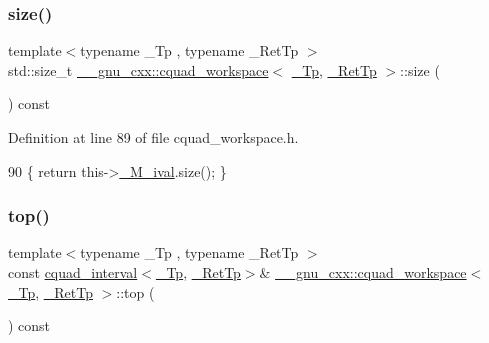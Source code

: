\subsubsection{\texorpdfstring{size()}{size()}}
{\footnotesize\ttfamily template$<$typename \+\_\+\+Tp , typename \+\_\+\+Ret\+Tp $>$ \\
std\+::size\+\_\+t \hyperlink{struct____gnu__cxx_1_1cquad__workspace}{\+\_\+\+\_\+gnu\+\_\+cxx\+::cquad\+\_\+workspace}$<$ \hyperlink{namespace____gnu__cxx_a3b19a9c800ca194374ef9172290f7d79}{\+\_\+\+Tp}, \hyperlink{namespace____gnu__cxx_a886e03ece3d53ff7fa6c098a40f93fa5}{\+\_\+\+Ret\+Tp} $>$\+::size (\begin{DoxyParamCaption}{ }\end{DoxyParamCaption}) const\hspace{0.3cm}{\ttfamily [inline]}}



Definition at line 89 of file cquad\+\_\+workspace.\+h.


\begin{DoxyCode}
90       \{ \textcolor{keywordflow}{return} this->\hyperlink{struct____gnu__cxx_1_1cquad__workspace_a46edeb05c52f2a406dc582b404fe83e6}{\_M\_ival}.size(); \}
\end{DoxyCode}
\mbox{\label{struct____gnu__cxx_1_1cquad__workspace_a6da1e7fd72a9a94fba84699b4f10a3b6}} 
\subsubsection{\texorpdfstring{top()}{top()}\hspace{0.1cm}{\footnotesize\ttfamily [1/2]}}
{\footnotesize\ttfamily template$<$typename \+\_\+\+Tp , typename \+\_\+\+Ret\+Tp $>$ \\
const \hyperlink{struct____gnu__cxx_1_1cquad__interval}{cquad\+\_\+interval}$<$\hyperlink{namespace____gnu__cxx_a3b19a9c800ca194374ef9172290f7d79}{\+\_\+\+Tp}, \hyperlink{namespace____gnu__cxx_a886e03ece3d53ff7fa6c098a40f93fa5}{\+\_\+\+Ret\+Tp}$>$\& \hyperlink{struct____gnu__cxx_1_1cquad__workspace}{\+\_\+\+\_\+gnu\+\_\+cxx\+::cquad\+\_\+workspace}$<$ \hyperlink{namespace____gnu__cxx_a3b19a9c800ca194374ef9172290f7d79}{\+\_\+\+Tp}, \hyperlink{namespace____gnu__cxx_a886e03ece3d53ff7fa6c098a40f93fa5}{\+\_\+\+Ret\+Tp} $>$\+::top (\begin{DoxyParamCaption}{ }\end{DoxyParamCaption}) const\hspace{0.3cm}{\ttfamily [inline]}}



